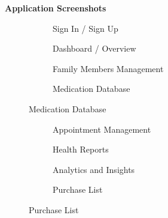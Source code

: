 \documentclass[12pt, a4paper]{report}
\begin{document}
\LARGE\textbf{Application Screenshots}
\begin{figure}[H]
\centering

\begin{subfigure}[b]{0.45\textwidth}
    \centering
    \caption{Sign In / Sign Up}
    \label{fig:signin}
\end{subfigure}
\hfill
\begin{subfigure}[b]{0.45\textwidth}
    \centering
    \caption{Dashboard / Overview}
    \label{fig:dashboard}
\end{subfigure}

\vspace{0.5cm}

\begin{subfigure}[b]{0.45\textwidth}
    \centering
    \caption{Family Members Management}
    \label{fig:family}
\end{subfigure}
\hfill
\begin{subfigure}[b]{0.45\textwidth}
    \centering
    \caption{Medication Database}
    \label{fig:medication}
\end{subfigure}
\end{figure}

\newpage

\begin{figure}[H]
\centering

\begin{subfigure}[b]{0.45\textwidth}
    \centering
    \caption{Appointment Management}
    \label{fig:appointment}
\end{subfigure}
\hfill
\begin{subfigure}[b]{0.45\textwidth}
    \centering
    \caption{Health Reports}
    \label{fig:reports}
\end{subfigure}

\vspace{0.5cm}

\begin{subfigure}[b]{0.45\textwidth}
    \centering
    \caption{Analytics and Insights}
    \label{fig:analytics}
\end{subfigure}
\hfill
\begin{subfigure}[b]{0.45\textwidth}
    \centering
    \caption{Purchase List}
    \label{fig:purchaselist}
\end{subfigure}
\end{figure}
\end{document}
